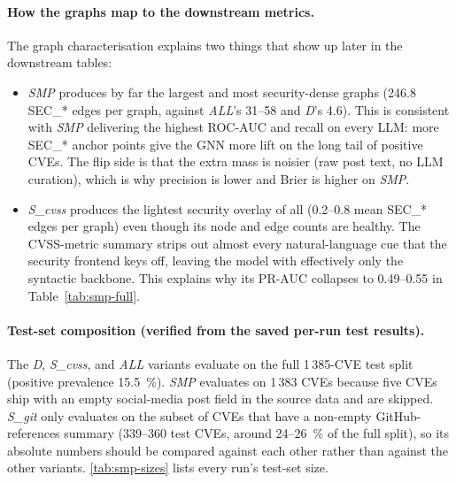 \documentclass[11pt,a4paper]{article}
\begin{document}
\paragraph{How the graphs map to the downstream metrics.}
The graph characterisation explains two things that show
up later in the downstream tables:
\begin{itemize}[leftmargin=*, itemsep=0pt]
    \item \emph{SMP} produces by far the largest and most
    security-dense graphs (246.8 SEC\_* edges per graph,
    against \emph{ALL}'s 31--58 and \emph{D}'s 4.6). This
    is consistent with \emph{SMP} delivering the highest
    ROC-AUC and recall on every LLM: more SEC\_* anchor
    points give the GNN more lift on the long tail of
    positive CVEs. The flip side is that the extra mass is
    noisier (raw post text, no LLM curation), which is why
    precision is lower and Brier is higher on \emph{SMP}.
    \item \emph{S\_cvss} produces the lightest security
    overlay of all (0.2--0.8 mean SEC\_* edges per graph)
    even though its node and edge counts are healthy. The
    CVSS-metric summary strips out almost every
    natural-language cue that the security frontend keys
    off, leaving the model with effectively only the
    syntactic backbone. This explains why its PR-AUC
    collapses to 0.49--0.55 in
    Table~\ref{tab:smp-full}.
\end{itemize}

\paragraph{Test-set composition (verified from the saved
per-run test results).}
The \emph{D}, \emph{S\_cvss}, and \emph{ALL} variants
evaluate on the full 1\,385-CVE test split (positive
prevalence 15.5~\%). \emph{SMP} evaluates on 1\,383 CVEs
because five CVEs ship with an empty social-media post
field in the source data and are skipped. \emph{S\_git}
only evaluates on the subset of CVEs that have a
non-empty GitHub-references summary (339--360 test
CVEs, around 24--26~\% of the full
split), so its absolute numbers should be compared against
each other rather than against the other variants.
\autoref{tab:smp-sizes} lists every run's test-set size.
\end{document}
